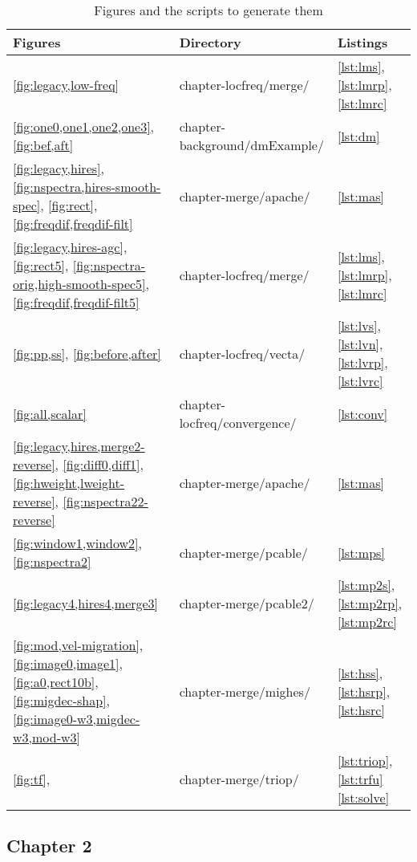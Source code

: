 \begin{table}[h]
\centering
\caption{Figures and the scripts to generate them}
\label{my-label}
\begin{tabular}{l|l|l}
\hline
        \textbf{Figures} & \textbf{Directory} & \textbf{Listings} \\ \hline 
        \ref{fig:legacy,low-freq} & chapter-locfreq/merge/ & \ref{lst:lms}, \ref{lst:lmrp}, \ref{lst:lmrc}\\ 
        \ref{fig:one0,one1,one2,one3}, \ref{fig:bef,aft} & chapter-background/dmExample/ & \ref{lst:dm} \\ 
        \ref{fig:legacy,hires}, \ref{fig:nspectra,hires-smooth-spec}, \ref{fig:rect}, \ref{fig:freqdif,freqdif-filt}           & chapter-merge/apache/ & \ref{lst:mas} \\ 
        \ref{fig:legacy,hires-agc}, \ref{fig:rect5}, \ref{fig:nspectra-orig,high-smooth-spec5}, \ref{fig:freqdif,freqdif-filt5}          & chapter-locfreq/merge/ &   \ref{lst:lms}, \ref{lst:lmrp}, \ref{lst:lmrc}\\ 
        \ref{fig:pp,ss}, \ref{fig:before,after}         & chapter-locfreq/vecta/&  \ref{lst:lvs}, \ref{lst:lvn}, \ref{lst:lvrp}, \ref{lst:lvrc}\\ 
        \ref{fig:all,scalar} & chapter-locfreq/convergence/&  \ref{lst:conv}\\ 
        \ref{fig:legacy,hires,merge2-reverse}, \ref{fig:diff0,diff1}, \ref{fig:hweight,lweight-reverse}, \ref{fig:nspectra22-reverse}           & chapter-merge/apache/ & \ref{lst:mas} \\ 
        \ref{fig:window1,window2}, \ref{fig:nspectra2} & chapter-merge/pcable/ & \ref{lst:mps} \\ 
        \ref{fig:legacy4,hires4,merge3}  & chapter-merge/pcable2/ & \ref{lst:mp2s}, \ref{lst:mp2rp}, \ref{lst:mp2rc}\\ 
        \ref{fig:mod,vel-migration}, \ref{fig:image0,image1}, \ref{fig:a0,rect10b}, \ref{fig:migdec-shap}, \ref{fig:image0-w3,migdec-w3,mod-w3} & chapter-merge/mighes/ & \ref{lst:hss}, \ref{lst:hsrp}, \ref{lst:hsrc}\\ 
        \ref{fig:tf}, & chapter-merge/triop/ & \ref{lst:triop}, \ref{lst:trfu} \ref{lst:solve}\\ 
\end{tabular}
\end{table}

\subsection{Chapter 2}

